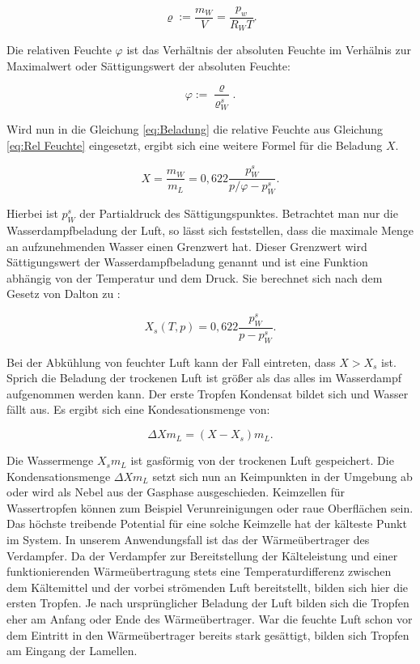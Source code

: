 \begin{equation}
\varrho := \frac{m_W}{V} = \frac{p_w}{R_W T}.
\label{eq:Absolute Feuchte}
\end{equation}


Die relativen Feuchte $\varphi$ ist das Verhältnis der absoluten Feuchte im Verhälnis zur Maximalwert oder Sättigungswert der absoluten Feuchte: 

\begin{equation}
 \varphi := \frac{\varrho}{\varrho_W^s}.
 \label{eq:Rel Feuchte}
\end{equation}

Wird nun in die Gleichung \ref{eq:Beladung} die relative Feuchte aus Gleichung \ref{eq:Rel Feuchte} eingesetzt, ergibt sich eine weitere Formel für die Beladung $X$. 

\begin{equation}
X = \frac{m_W}{m_L} = 0,622 \frac{p_{W}^s}{p/\varphi - p_{W}^s}.
\label{eq:Beladung 2}
\end{equation}

Hierbei ist $p_{W}^s$ der Partialdruck des Sättigungspunktes.
Betrachtet man nur die Wasserdampfbeladung der Luft, so lässt sich feststellen, dass die maximale Menge an aufzunehmenden Wasser einen Grenzwert hat. Dieser Grenzwert wird Sättigungswert der Wasserdampfbeladung genannt und ist eine Funktion abhängig von der Temperatur und dem Druck.  Sie berechnet sich nach dem Gesetz von Dalton zu :

\begin{equation}
 X_s (T,p) = 0,622 \frac{p_{W}^s}{p - p_{W}^s}.
 \label{eq:Sättigungsbeladung}
\end{equation}

Bei der Abkühlung von feuchter Luft kann der Fall eintreten, dass $X > X_s$ ist. Sprich die Beladung der trockenen Luft ist größer als das alles im Wasserdampf aufgenommen werden kann. Der erste Tropfen Kondensat bildet sich und Wasser fällt aus. Es ergibt sich eine Kondesationsmenge von:

\begin{equation}
\Delta X m_L = (X - X_s)m_L.
\label{eq:Delta_X}
\end{equation}

Die Wassermenge $X_s m_L$ ist gasförmig von der trockenen Luft gespeichert. Die Kondensationsmenge $\Delta X m_L$ setzt sich nun an Keimpunkten in der Umgebung ab oder wird als Nebel aus der Gasphase ausgeschieden. Keimzellen für Wassertropfen können zum Beispiel Verunreinigungen oder raue Oberflächen sein. Das höchste treibende Potential für eine solche Keimzelle hat der kälteste Punkt im System. In unserem Anwendungsfall ist das der Wärmeübertrager des Verdampfer. Da der Verdampfer zur Bereitstellung der Kälteleistung und einer funktionierenden Wärmeübertragung stets eine Temperaturdifferenz zwischen dem Kältemittel und der vorbei strömenden Luft  bereitstellt,  bilden sich hier die ersten Tropfen. Je nach ursprünglicher Beladung der Luft bilden sich die Tropfen eher am Anfang oder Ende des Wärmeübertrager. War die feuchte Luft schon vor dem Eintritt in den Wärmeübertrager bereits stark gesättigt, bilden sich Tropfen am Eingang der Lamellen. \citep{Danfoss2006}

